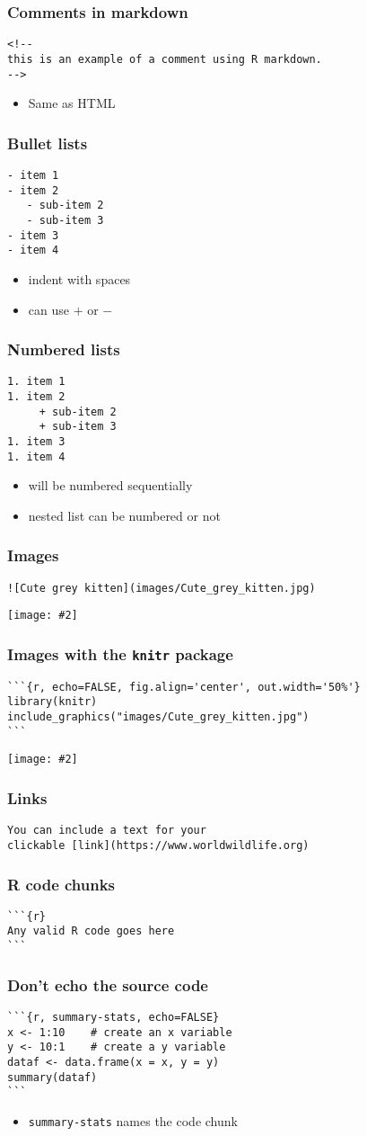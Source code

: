 \documentclass{beamer}
\newcommand{\bi}{\begin{itemize}}
\newcommand{\li}{\item}
\newcommand{\ei}{\end{itemize}}
\newcommand{\fig}[2]{\centerline{\texttt{[image: \#2]}}}
\newcommand{\bfr}[1]{\begin{frame}[fragile]\frametitle{{ #1 }}}
\begin{document}
\bfr{Comments in markdown}
\begin{verbatim}
<!--
this is an example of a comment using R markdown.
-->
\end{verbatim}
\bi
\li Same as HTML
\ei
\end{frame}

\bfr{Bullet lists}
\begin{verbatim}
- item 1
- item 2
   - sub-item 2
   - sub-item 3
- item 3
- item 4
\end{verbatim}
\bi
\li indent with spaces
\li can use $+$ or $-$
\ei
\end{frame}
\bfr{Numbered lists}
\begin{verbatim}
1. item 1
1. item 2
     + sub-item 2
     + sub-item 3
1. item 3
1. item 4
\end{verbatim}
\bi
\li will be numbered sequentially
\li nested list can be numbered or not
\ei
\end{frame}


\bfr{Images}
\begin{verbatim}
![Cute grey kitten](images/Cute_grey_kitten.jpg)
\end{verbatim}
\fig{.8}{Cute_grey_kitten.jpg}
\end{frame}


\bfr{Images with the {\tt knitr} package}
\begin{verbatim}
```{r, echo=FALSE, fig.align='center', out.width='50%'}
library(knitr)
include_graphics("images/Cute_grey_kitten.jpg")
```
\end{verbatim}
\begin{center}
\fig{.5}{Cute_grey_kitten}
\end{center}
\end{frame}


\bfr{Links}
\begin{verbatim}
You can include a text for your
clickable [link](https://www.worldwildlife.org)
\end{verbatim}
\end{frame}



\bfr{R code chunks}
\begin{verbatim}
```{r}
Any valid R code goes here
```
\end{verbatim}
\end{frame}


\bfr{Don't echo the source code}
\begin{verbatim}
```{r, summary-stats, echo=FALSE}
x <- 1:10    # create an x variable
y <- 10:1    # create a y variable
dataf <- data.frame(x = x, y = y)
summary(dataf)
```
\end{verbatim}
\bi
\li {\tt summary-stats} names the code chunk
\ei
\end{frame}
\end{document}
